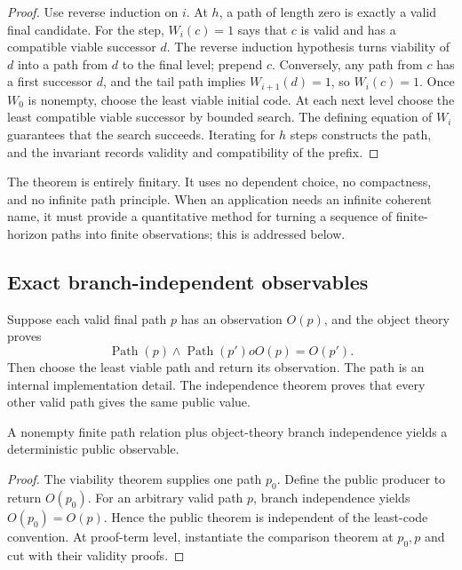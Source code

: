 \begin{proof}
Use reverse induction on \(i\).  At \(h\), a path of length zero is exactly a valid final candidate.  For the
step, \(W_i(c)=1\) says that \(c\) is valid and has a compatible viable successor \(d\).  The reverse
induction hypothesis turns viability of \(d\) into a path from \(d\) to the final level; prepend \(c\).
Conversely, any path from \(c\) has a first successor \(d\), and the tail path implies \(W_{i+1}(d)=1\), so
\(W_i(c)=1\).  Once \(W_0\) is nonempty, choose the least viable initial code.  At each next level choose
the least compatible viable successor by bounded search.  The defining equation of \(W_i\) guarantees that
the search succeeds.  Iterating for \(h\) steps constructs the path, and the invariant records validity and
compatibility of the prefix.
\end{proof}

The theorem is entirely finitary.  It uses no dependent choice, no compactness, and no infinite path
principle.  When an application needs an infinite coherent name, it must provide a quantitative method for
turning a sequence of finite-horizon paths into finite observations; this is addressed below.

\subsection{Exact branch-independent observables}

Suppose each valid final path \(p\) has an observation \(O(p)\), and the object theory proves
\[
  \operatorname{Path}(p)\wedge\operatorname{Path}(p')	o O(p)=O(p').
\]
Then choose the least viable path and return its observation.  The path is an internal implementation
detail.  The independence theorem proves that every other valid path gives the same public value.

\begin{theorem}
A nonempty finite path relation plus object-theory branch independence yields a deterministic public
observable.
\end{theorem}
\begin{proof}
The viability theorem supplies one path \(p_0\).  Define the public producer to return \(O(p_0)\).  For an
arbitrary valid path \(p\), branch independence yields \(O(p_0)=O(p)\).  Hence the public theorem is
independent of the least-code convention.  At proof-term level, instantiate the comparison theorem at
\(p_0,p\) and cut with their validity proofs.
\end{proof}

